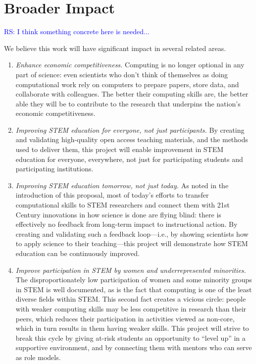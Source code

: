 \documentclass{proposalnsf}
\newlength{\up}
\newcommand{\comment}[1]{\textcolor{blue}{ #1 }}
\begin{document}
\section{Broader Impact}

\comment{RS: I think something concrete here is needed...}

We believe this work will have significant impact in several related
areas.

\begin{enumerate}

\item
  \emph{Enhance economic competitiveness.} Computing is no longer
  optional in any part of science: even scientists who don't think of
  themselves as doing computational work rely on computers to prepare
  papers, store data, and collaborate with colleagues.  The better
  their computing skills are, the better able they will be to
  contribute to the research that underpins the nation's economic
  competitiveness.

\item
  \emph{Improving STEM education for everyone, not just participants.}
  By creating and validating high-quality open access teaching
  materials, and the methods used to deliver them, this project will
  enable improvement in STEM education for everyone, everywhere, not
  just for participating students and participating institutions.

\item
  \emph{Improving STEM education tomorrow, not just today.}  As noted
  in the introduction of this proposal, most of today's efforts to
  transfer computational skills to STEM researchers and connect them
  with 21st Century innovations in how science is done are flying
  blind: there is effectively no feedback from long-term impact to
  instructional action.  By creating and validating such a feedback
  loop---i.e., by showing scientists how to apply science to their
  teaching---this project will demonstrate how STEM education can be
  continuously improved.

\item
  \emph{Improve participation in STEM by women and underrepresented
    minorities.} The disproportionately low participation of women and
  some minority groups in STEM is well documented, as is the fact that
  computing is one of the least diverse fields within STEM.  This
  second fact creates a vicious circle: people with weaker computing
  skills may be less competitive in research than their peers, which
  reduces their participation in activities viewed as non-core, which
  in turn results in them having weaker skills.  This project will
  strive to break this cycle by giving at-risk students an opportunity
  to ``level up'' in a supportive environment, and by connecting them
  with mentors who can serve as role models.

\end{enumerate}
\end{document}
